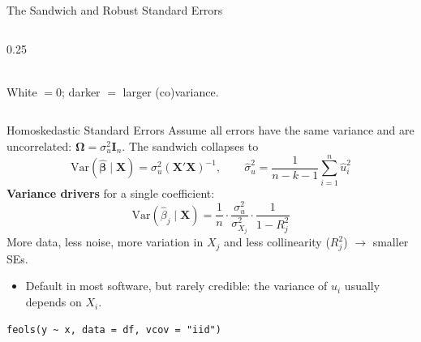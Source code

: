 \documentclass[9pt,aspectratio=169]{beamer}
\newcommand{\Var}{\mathrm{Var}}
\begin{document}
\begin{frame}{The Sandwich and Robust Standard Errors}
\begin{columns}[c]
\begin{column}{0.25\textwidth}
\\[0.2em]
  {\tiny White $=0$; darker $=$ larger (co)variance.}
  \end{column}
  \end{columns}
\end{frame}

\begin{frame}[fragile]{Homoskedastic Standard Errors}
\linespread{1.2}\selectfont
  Assume all errors have the same variance and are uncorrelated: $\bm\Omega=\sigma^2_u\bm I_n$. The sandwich collapses to
  \[
    \Var(\hat{\bm\beta}\mid\bm X)=\sigma^2_u(\bm X'\bm X)^{-1},
    \qquad
    \hat\sigma^2_u=\frac{1}{n-k-1}\sum_{i=1}^n\hat u_i^2
  \]
  \textbf{Variance drivers} for a single coefficient:
  \[
    \Var(\hat\beta_j\mid\bm X)=\frac{1}{n}\cdot\frac{\sigma_u^2}{\sigma^2_{X_j}}\cdot\frac{1}{1-R_j^2}
  \]
  More data, less noise, more variation in $X_j$ and less collinearity ($R_j^2$) $\rightarrow$ smaller SEs.
  \begin{itemize}
    \item Default in most software, but rarely credible: the variance of $u_i$ usually depends on $X_i$.
  \end{itemize}
  \begin{lstlisting}
feols(y ~ x, data = df, vcov = "iid")
  \end{lstlisting}
\end{frame}
\end{document}
